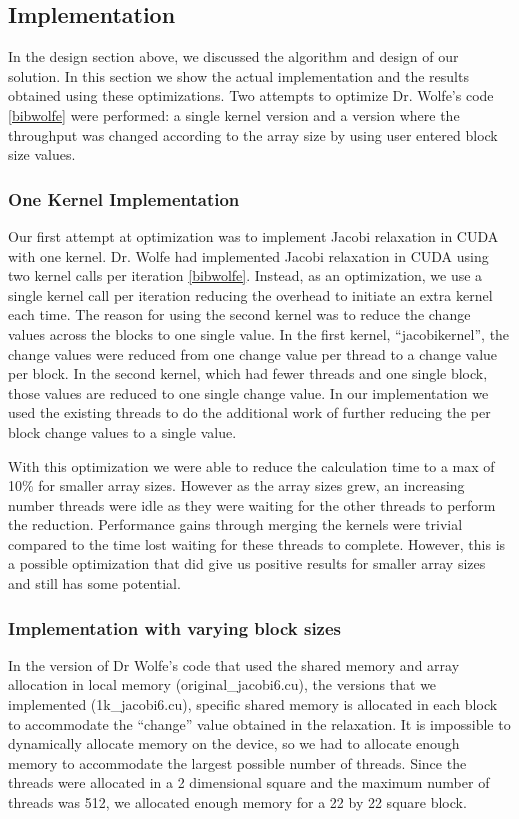 \documentclass[10pt]{article}
\begin{document}
\begin{multicols}{2}
  \subsection{Implementation}
  In the design section above, we discussed the algorithm and design of our solution.
  In this section we show the actual implementation and the results obtained using these optimizations.
  Two attempts to optimize Dr. Wolfe's code \ref{bibwolfe} were performed: a single kernel version and a version where the throughput was changed according to the array size by using user entered block size values.

  \subsubsection{One Kernel Implementation}
  Our first attempt at optimization was to implement Jacobi relaxation in CUDA with one kernel.
  Dr. Wolfe had implemented Jacobi relaxation in CUDA using two kernel calls per iteration \ref{bibwolfe}.
  Instead, as an optimization, we use a single kernel call per iteration reducing the overhead to initiate an extra kernel each time.
  The reason for using the second kernel was to reduce the change values across the blocks to one single value.
  In the first kernel, ``jacobikernel'', the change values were reduced from one change value per thread to a change value per block.
  In the second kernel, which had fewer threads and one single block, those values are reduced to one single change value.
  In our implementation we used the existing threads to do the additional work of further reducing the per block change values to a single value.

  With this optimization we were able to reduce the calculation time to a max of 10\% for smaller array sizes.
  However as the array sizes grew, an increasing number threads were idle as they were waiting for the other threads to perform the reduction.
   Performance gains through merging the kernels were trivial compared to the time lost waiting for these threads to complete.
  However, this is a possible optimization that did give us positive results for smaller array sizes and still has some potential.
  
  \subsubsection{Implementation with varying block sizes}
  In the version of Dr Wolfe's code that used the shared memory and array allocation in local memory (original\_jacobi6.cu), the versions that we implemented (1k\_jacobi6.cu), specific shared memory is allocated in each block to accommodate the ``change'' value obtained in the relaxation.
  It is impossible to dynamically allocate memory on the device, so we had to allocate enough memory to accommodate the largest possible number of threads.
  Since the threads were allocated in a 2 dimensional square and the maximum number of threads was 512, we allocated enough memory for a 22 by 22 square block.


\end{multicols}
\end{document}
